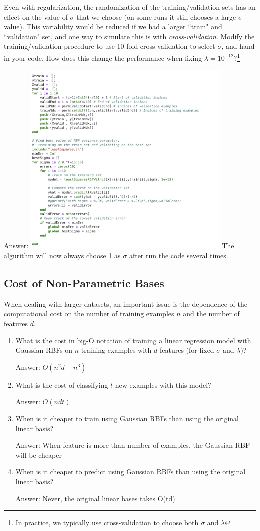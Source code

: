 \documentclass{article}
\def\ans#1{\par\gre{Answer: #1}}
\def\blu#1{{\color{blu}#1}}
\def\gre#1{{\color{gre}#1}}
\def\enum#1{\begin{enumerate}#1\end{enumerate}}
\begin{document}
Even with regularization, the randomization of the training/validation sets has an effect on the value of $\sigma$ that we choose (on some runs it still chooses a large $\sigma$ value).
This variability would be reduced if we had a larger ``train" and ``validation" set, and one way to simulate this is with \emph{cross-validation}. \blu{Modify the training/validation procedure to use 10-fold cross-validation to select $\sigma$, and hand in your code. How does this change the performance when fixing $\lambda = 10^{-12}$?}\footnote{In practice, we typically use cross-validation to choose both $\sigma$ and $\lambda$}
\ans{ \includegraphics[width=10cm]{q12Code.png} The algurithm will now always choose 1 as $\sigma$ after run the code several times.}

\subsection{Cost of Non-Parametric Bases}

When dealing with larger datasets, an important issue is the dependence of the computational cost on the number of training examples $n$ and the number of features $d$. 
\blu{
\enum{
\item What is the cost in big-O notation of training a linear regression model with Gaussian RBFs on $n$ training examples with $d$ features (for fixed $\sigma$ and $\lambda$)?  \ans{$O(n^2d+n^3)$}
\item What is the cost of classifying $t$ new examples with this model? \ans{$O(ndt)$}
\item When is it cheaper to train using Gaussian RBFs than using the original linear basis? \ans{When feature is more than number of examples, the Gaussian RBF will be cheaper}
\item When is it cheaper to predict using Gaussian RBFs than using the original linear basis? \ans{Never, the original linear bases takes O(td)}
}}
\end{document}
